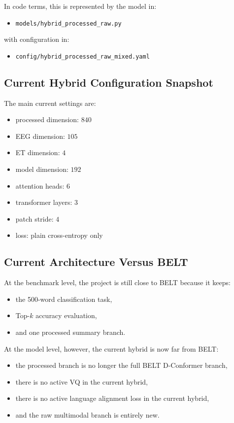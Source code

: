 \documentclass[11pt]{article}
\begin{document}
In code terms, this is represented by the model in:
\begin{itemize}
    \item \texttt{models/hybrid\_processed\_raw.py}
\end{itemize}

with configuration in:
\begin{itemize}
    \item \texttt{config/hybrid\_processed\_raw\_mixed.yaml}
\end{itemize}

\subsection{Current Hybrid Configuration Snapshot}

The main current settings are:
\begin{itemize}
    \item processed dimension: \(840\)
    \item EEG dimension: \(105\)
    \item ET dimension: \(4\)
    \item model dimension: \(192\)
    \item attention heads: \(6\)
    \item transformer layers: \(3\)
    \item patch stride: \(4\)
    \item loss: plain cross-entropy only
\end{itemize}

\subsection{Current Architecture Versus BELT}

At the benchmark level, the project is still close to BELT because it keeps:
\begin{itemize}
    \item the 500-word classification task,
    \item Top-\(k\) accuracy evaluation,
    \item and one processed summary branch.
\end{itemize}

At the model level, however, the current hybrid is now far from BELT:
\begin{itemize}
    \item the processed branch is no longer the full BELT D-Conformer branch,
    \item there is no active VQ in the current hybrid,
    \item there is no active language alignment loss in the current hybrid,
    \item and the raw multimodal branch is entirely new.
\end{itemize}
\end{document}
